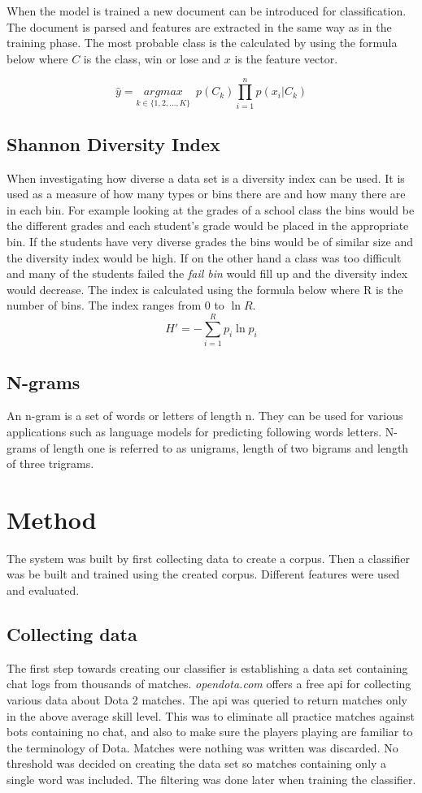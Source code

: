 \documentclass[12pt,a4paper]{article}
\begin{document}
When the model is trained a new document can be introduced for classification.
The document is parsed and features are extracted in the same way as in the training phase.
The most probable class is the calculated by using the formula below where $C$ is the class, win or lose
and $x$ is the feature vector.

$$\hat{y} = \underset{k \in \{1,2,...,K\}}{argmax} \, \, \, p(C_{k}) \prod_{i=1}^{n} p (x_{i}|C_{k})$$

\subsection{Shannon Diversity Index}
When investigating how diverse a data set is a diversity index can be used.
It is used as a measure of how many types or bins there are and how many there are in each bin.
For example looking at the grades of a school class the bins would be the different grades
and each student's grade would be placed in the appropriate bin.
If the students have very diverse grades the bins would be of similar size and the diversity index would be high.
If on the other hand a class was too difficult and many of the students failed the \textit{fail bin} would fill up
and the diversity index would decrease.
The index is calculated using the formula below where R is the number of bins. The index ranges from $0$ to $\ln{R}$.
$$H' = -\sum_{i=1}^{R}p_i \ln{p_i}$$

\subsection{N-grams}
An n-gram is a set of words or letters of length n.
They can be used for various applications such as language models for predicting following words letters.
N-grams of length one is referred to as unigrams, length of two bigrams and length of three trigrams.

\section{Method}
The system was built by first collecting data to create a corpus.
Then a classifier was be built and trained using the created corpus.
Different features were used and evaluated.

\subsection{Collecting data}
The first step towards creating our classifier is establishing a data set containing chat logs from thousands of matches.
\textit{opendota.com} offers a free api for collecting various data about Dota 2 matches.
The api was queried to return matches only in the above average skill level.
This was to eliminate all practice matches against bots containing no chat,
and also to make sure the players playing are familiar to the terminology of Dota.
Matches were nothing was written was discarded.
No threshold was decided on creating the data set so matches containing only a single word was included.
The filtering was done later when training the classifier.
\end{document}

